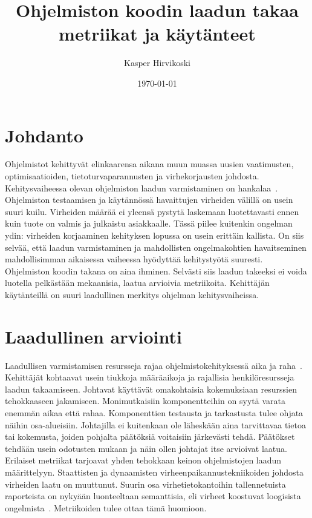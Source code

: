 \documentclass[finnish]{../tktltiki2}
\title{Ohjelmiston koodin laadun takaa metriikat ja käytänteet}
\author{Kasper Hirvikoski}
\date{\today}
\theoremstyle{definition}
\theoremstyle{remark}
\begin{document}

\maketitle

\tableofcontents
\newpage


\section{Johdanto}

Ohjelmistot kehittyvät elinkaarensa aikana muun muassa uusien vaatimusten, optimisaatioiden, tietoturvaparannusten ja 
virhekorjausten johdosta. Kehitysvaiheessa olevan ohjelmiston laadun varmistaminen on hankalaa~\cite{NB05, ZN08, MND09}. 
Ohjelmiston testaamisen ja käytännössä havaittujen virheiden välillä on usein suuri kuilu. Virheiden määrää ei yleensä 
pystytä laskemaan luotettavasti ennen kuin tuote on valmis ja julkaistu asiakkaalle. Tässä piilee kuitenkin ongelman 
ydin: virheiden korjaaminen kehityksen lopussa on usein erittäin kallista. On siis selvää, että laadun varmistaminen ja 
mahdollisten ongelmakohtien havaitseminen mahdollisimman aikaisessa vaiheessa hyödyttää kehitystyötä suuresti. 
Ohjelmiston koodin takana on aina ihminen. Selvästi siis laadun takeeksi ei voida luotella pelkästään mekaanisia, laatua 
arvioivia metriikoita. Kehittäjän käytänteillä on suuri laadullinen merkitys ohjelman kehitysvaiheissa.

\section{Laadullinen arviointi}

Laadullisen varmistamisen resursseja rajaa ohjelmistokehityksessä aika ja raha~\cite{ZN08}. Kehittäjät kohtaavat usein 
tiukkoja määräaikoja ja rajallisia henkilöresursseja laadun takaamiseen. Johtavat käyttävät omakohtaisia kokemuksiaan 
resurssien tehokkaaseen jakamiseen. Monimutkaisiin komponentteihin on syytä varata enemmän aikaa että rahaa. 
Komponenttien testausta ja tarkastusta tulee ohjata näihin osa-alueisiin. Johtajilla ei kuitenkaan ole läheskään aina 
tarvittavaa tietoa tai kokemusta, joiden pohjalta päätöksiä voitaisiin järkevästi tehdä. Päätökset tehdään usein 
odotusten mukaan ja näin ollen johtajat itse arvioivat laatua. Erilaiset metriikat tarjoavat yhden tehokkaan keinon 
ohjelmistojen laadun määrittelyyn. Staattisten ja dynaamisten virheenpaikannustekniikoiden johdosta virheiden laatu 
on muuttunut. Suurin osa virhetietokantoihin tallennetuista raporteista on nykyään luonteeltaan semanttisia, eli virheet 
koostuvat loogisista ongelmista~\cite{ZN08}. Metriikoiden tulee ottaa tämä huomioon.
\end{document}

